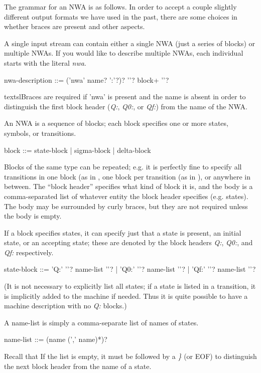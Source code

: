 The grammar for an NWA is as follows. In order to accept a couple
slightly different output formats we have used in the past, there are
some choices in whether braces are present and other aspects.


A single input stream can contain either a single NWA (just a series
of blocks) or multiple NWAs. If you would like to describe multiple
NWAs, each individual starts with the literal \textsl{nwa}.

  nwa-description  ::= ('nwa' name? ':'?)? '{'? block+ '}'?

textsl{Braces are required if 'nwa' is present and the name is absent}
 in order to
 distinguish the first block header (\textsl{Q:}, \textsl{Q0:},
 or \textsl{Qf:}) from the name of the NWA.

An NWA is a sequence of blocks; each block specifies one or more
states, symbols, or transitions.

  block  ::=  state-block
           |  sigma-block
           |  delta-block

Blocks of the same type can be repeated; e.g. it is perfectly fine to
specify all transitions in one block (as in ,
one block per transition (as in ), or
anywhere in between. The ``block header'' specifies what kind of block
it is, and the body is a comma-separated list of whatever entity the
block header specifies (e.g. states). The body may be surrounded by
curly braces, but they are not required unless the body is empty.

If a block specifies states, it can specify just that a state is
present, an initial state, or an accepting state; these are denoted by
the block headers \textsl{Q:}, \textsl{Q0:}, and \textsl{Qf:}
respectively.
 
  state-block  ::=  'Q:'   '{'?  name-list  '}'?
                 |  'Q0:'  '{'?  name-list  '}'?
                 |  'Qf:'  '{'?  name-list  '}'?

(It is not necessary to explicitly list all states; if a state is
listed in a transition, it is implicitly added to the machine if
needed. Thus it is quite possible to have a machine description with
no \textsl{Q:} blocks.)

A name-list is simply a comma-separate list of names of states.

  name-list ::=  (name (','  name)*)?

Recall that If the list is empty, it must be followed by a \textsl{\}}
(or EOF) to distinguish the next block header from the name of a
state.

